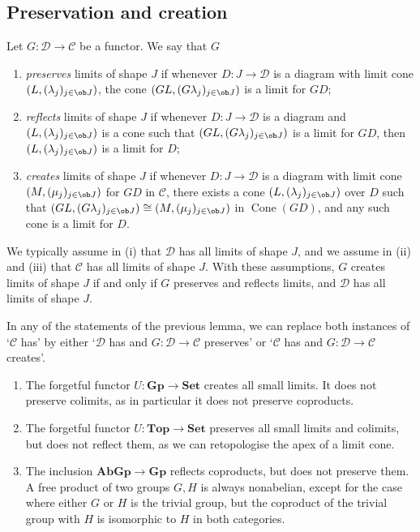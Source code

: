 \subsection{Preservation and creation}
\begin{definition}
    Let \( G : \mathcal D \to \mathcal C \) be a functor.
    We say that \( G \)
    \begin{enumerate}
        \item \emph{preserves} limits of shape \( J \) if whenever \( D : J \to \mathcal D \) is a diagram with limit cone \( (L, (\lambda_j)_{j \in \ob J}) \), the cone \( (GL, (G\lambda_j)_{j \in \ob J}) \) is a limit for \( GD \);
        \item \emph{reflects} limits of shape \( J \) if whenever \( D : J \to \mathcal D \) is a diagram and \( (L, (\lambda_j)_{j \in \ob J}) \) is a cone such that \( (GL, (G\lambda_j)_{j \in \ob J}) \) is a limit for \( GD \), then \( (L, (\lambda_j)_{j \in \ob J}) \) is a limit for \( D \);
        \item \emph{creates} limits of shape \( J \) if whenever \( D : J \to \mathcal D \) is a diagram with limit cone \( (M, (\mu_j)_{j \in \ob J}) \) for \( GD \) in \( \mathcal C \), there exists a cone \( (L, (\lambda_j)_{j \in \ob J}) \) over \( D \) such that \( (GL, (G\lambda_j)_{j \in \ob J}) \cong (M, (\mu_j)_{j \in \ob J}) \) in \( \operatorname{Cone}(GD) \), and any such cone is a limit for \( D \).
    \end{enumerate}
\end{definition}
We typically assume in (i) that \( \mathcal D \) has all limits of shape \( J \), and we assume in (ii) and (iii) that \( \mathcal C \) has all limits of shape \( J \).
With these assumptions, \( G \) creates limits of shape \( J \) if and only if \( G \) preserves and reflects limits, and \( \mathcal D \) has all limits of shape \( J \).
\begin{corollary}
    In any of the statements of the previous lemma, we can replace both instances of `\( \mathcal C \) has' by either `\( \mathcal D \) has and \( G : \mathcal D \to \mathcal C \) preserves' or `\( \mathcal C \) has and \( G : \mathcal D \to \mathcal C \) creates'.
\end{corollary}
\begin{example}
    \begin{enumerate}
        \item The forgetful functor \( U : \mathbf{Gp} \to \mathbf{Set} \) creates all small limits.
        It does not preserve colimits, as in particular it does not preserve coproducts.
        \item The forgetful functor \( U : \mathbf{Top} \to \mathbf{Set} \) preserves all small limits and colimits, but does not reflect them, as we can retopologise the apex of a limit cone.
        \item The inclusion \( \mathbf{AbGp} \to \mathbf{Gp} \) reflects coproducts, but does not preserve them.
        A free product of two groups \( G, H \) is always nonabelian, except for the case where either \( G \) or \( H \) is the trivial group, but the coproduct of the trivial group with \( H \) is isomorphic to \( H \) in both categories.
    \end{enumerate}
\end{example}
